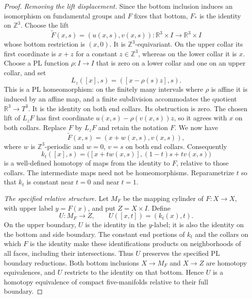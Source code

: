 \begin{proof}
\emph{Removing the lift displacement.}
Since the bottom inclusion induces an isomorphism on
fundamental groups and $F$ fixes that bottom, $F_*$ is
the identity on $\mathbb Z^3$.  Choose the lift
\[
 \widetilde F(x,s)=(u(x,s),v(x,s)):
                    \mathbb R^3\times I\longrightarrow
                    \mathbb R^3\times I
\]
whose bottom restriction is $(x,0)$.  It is
$\mathbb Z^3$-equivariant.  On the upper collar its first
coordinate is $x+z$ for a constant $z\in\mathbb Z^3$,
whereas on the lower collar it is $x$.
Choose a PL function $\rho:I\to I$ that is zero on a
lower collar and one on an upper collar, and set
\begin{equation}\label{eq:three-torus-lift-correction}
 L_z([x],s)=([x-\rho(s)z],s).
\end{equation}
This is a PL homeomorphism: on the finitely many intervals
where $\rho$ is affine it is induced by an affine map,
and a finite subdivision accommodates the quotient
$\mathbb R^3\to T^3$.  It is the identity on both end
collars.  Its obstruction is zero.  The chosen lift of
$L_zF$ has first coordinate $u(x,s)-\rho(v(x,s))z$,
so it agrees with $x$ on both collars.  Replace $F$ by
$L_zF$ and retain the notation $F$.  We now have
\[
 \widetilde F(x,s)=(x+w(x,s),v(x,s)),
\]
where $w$ is $\mathbb Z^3$-periodic and $w=0$, $v=s$
on both end collars.  Consequently
\begin{equation}\label{eq:three-torus-relative-homotopy}
 k_t([x],s)=
 \bigl([x+t w(x,s)],(1-t)s+t v(x,s)\bigr)
\end{equation}
is a well-defined homotopy of maps from the identity to
$F$, relative to those collars.  The intermediate maps
need not be homeomorphisms.  Reparametrize $t$ so that
$k_t$ is constant near $t=0$ and near $t=1$.

\emph{The specified relative structure.}
Let $M_F$ be the mapping cylinder of $F:X\to X$, with
upper label $y=F(x)$, and put $Z=X\times I$.
Define
\begin{equation}\label{eq:three-torus-relative-structure}
 U:M_F\longrightarrow Z,
 \qquad U([x,t])=(k_t(x),t).
\end{equation}
On the upper boundary, $U$ is the identity in the
$y$-label; it is also the identity on the bottom and
side boundary.  The constant end portions of $k_t$ and
the collars on which $F$ is the identity make these
identifications products on neighborhoods of all faces,
including their intersections.  Thus $U$ preserves the
specified PL boundary reductions.  Both bottom inclusions
$X\to M_F$ and $X\to Z$ are homotopy equivalences, and
$U$ restricts to the identity on that bottom.  Hence
$U$ is a homotopy equivalence of compact five-manifolds
relative to their full boundary.


\end{proof}
